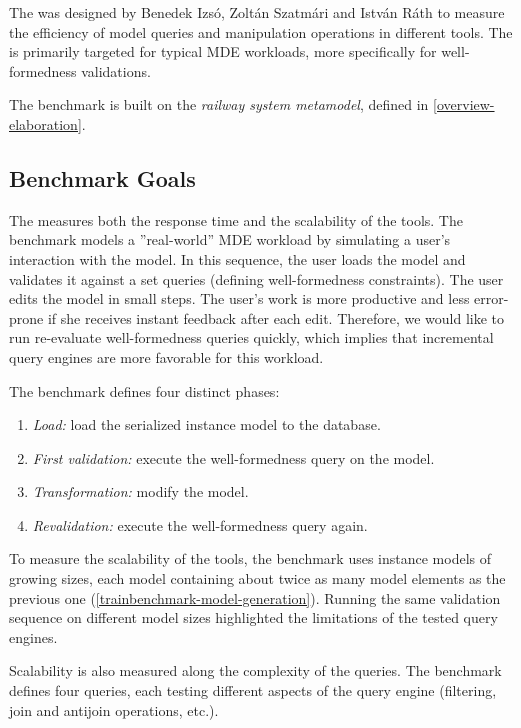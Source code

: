 The \tb{} was designed by Benedek Izsó, Zoltán Szatmári and István Ráth \cite{high-performance-queries} to measure the efficiency of model queries and manipulation operations in different tools. The \tb{} is primarily targeted for typical MDE workloads, more specifically for well-formedness validations.

The benchmark is built on the \emph{railway system metamodel}, defined in \autoref{overview-elaboration}.

\subsection{Benchmark Goals}

The \tb{} measures both the response time and the scalability of the tools. The benchmark models a ''real-world'' MDE workload by simulating a user's interaction with the model. In this sequence, the user loads the model and validates it against a set  queries (defining well-formedness constraints). The user edits the model in small steps. The user's work is more productive and less error-prone if she receives instant feedback after each edit. Therefore, we would like to run re-evaluate well-formedness queries quickly, which implies that incremental query engines are more favorable for this workload.

The benchmark defines four distinct phases:

\begin{enumerate}
  \item \emph{Load:} load the serialized instance model to the database.
  \item \emph{First validation:} execute the well-formedness query on the model.
  \item \emph{Transformation:} modify the model.
  \item \emph{Revalidation:} execute the well-formedness query again.
\end{enumerate}

To measure the scalability of the tools, the benchmark uses instance models of growing sizes, each model containing about twice as many model elements as the previous one (\autoref{trainbenchmark-model-generation}). Running the same validation sequence on different model sizes highlighted the limitations of the tested query engines.

Scalability is also measured along the complexity of the queries. The benchmark defines four queries, each testing different aspects of the query engine (filtering, join and antijoin operations, etc.).

